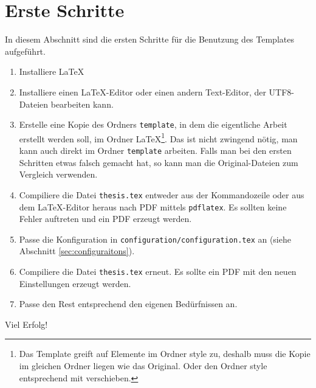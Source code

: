 %
\section{Erste Schritte}
In diesem Abschnitt sind die ersten Schritte für die Benutzung des Templates aufgeführt.
\begin{enumerate}
\item Installiere \LaTeX
\item Installiere einen \LaTeX-Editor oder einen andern Text-Editor, der UTF8-Dateien bearbeiten kann.
\item Erstelle eine Kopie des Ordners \texttt{template}, in dem die eigentliche Arbeit erstellt werden soll, im Ordner LaTeX\footnote{Das Template greift auf Elemente im Ordner style zu, deshalb muss die Kopie im gleichen Ordner liegen wie das Original. Oder den Ordner style entsprechend mit verschieben.}. Das ist nicht zwingend nötig, man kann auch direkt im Ordner \texttt{template} arbeiten. Falls man bei den ersten Schritten etwas falsch gemacht hat, so kann man die Original-Dateien zum Vergleich verwenden.
\item Compiliere die Datei \texttt{thesis.tex} entweder aus der Kommandozeile oder aus dem \LaTeX-Editor heraus nach PDF mittels \texttt{pdflatex}. Es sollten keine Fehler auftreten und ein PDF erzeugt werden.
\item Passe die Konfiguration in \texttt{configuration/configuration.tex} an (siehe Abschnitt \ref{sec:configuraitons}).
\item Compiliere die Datei \texttt{thesis.tex} erneut. Es sollte ein PDF mit den neuen Einstellungen erzeugt werden.
\item Passe den Rest entsprechend den eigenen Bedürfnissen an.
\end{enumerate}

Viel Erfolg!
